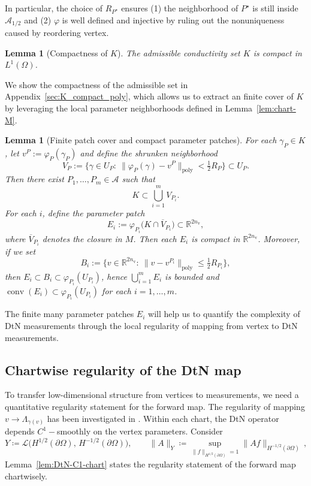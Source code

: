 \documentclass{article}
\newcommand{\R}{\mathbb{R}}
\newtheorem{lemma}[theorem]{Lemma}
\begin{document}
In particular, the choice of $R_{P^\star}$ ensures (1) the neighborhood of $P^\star$ is still inside $\mathcal{A}_{1/2}$ and (2) $\varphi$ is well defined and injective by ruling out the nonuniqueness caused by reordering vertex. 


\begin{lemma}[Compactness of $K$]\label{lem:K_compact_poly}
The admissible conductivity set $K$ is compact in $L^1(\Omega)$.
\end{lemma}
We show the compactness of the admissible set in Appendix~\ref{sec:K_compact_poly}, which allows us to extract an finite cover of $K$ by leveraging the local parameter neighborhoods defined in Lemma~\ref{lem:chart-M}.

\begin{lemma}[Finite patch cover and compact parameter patches]\label{lem:finite-atlas}
For each $\gamma_P\in K$, let $v^P:=\varphi_P(\gamma_P)$ and define the shrunken neighborhood
\[
V_{P}:=\Big\{\gamma\in U_P:\ \|\varphi_P(\gamma)-v^{P}\|_{\mathrm{poly}}<\tfrac12 R_{P}\Big\}\subset U_P .
\]
Then there exist $P_1,\dots,P_m\in\mathcal A$ such that
\[
K\subset \bigcup_{i=1}^m V_{P_i}.
\]
For each $i$, define the parameter patch
\[
E_i:=\varphi_{P_i}\bigl(K\cap \overline{V}_{P_i}\bigr)\subset \R^{2n_{\mathrm v}},
\]
where $\overline{V}_{P_i}$ denotes the closure in $M$.
Then each $E_i$ is compact in $\R^{2n_{\mathrm v}}$. Moreover, if we set
\[
B_i:=\Big\{v\in\R^{2n_{\mathrm v}}:\ \|v-v^{P_i}\|_{\mathrm{poly}}\le \tfrac12 R_{P_i}\Big\},
\]
then $E_i\subset B_i\subset \varphi_{P_i}(U_{P_i})$, hence $\bigcup_{i=1}^m E_i$ is bounded and $\operatorname{conv}(E_i)\subset \varphi_{P_i}(U_{P_i})$ for each  $i=1,\dots,m$.

\end{lemma}

The finite many parameter patches $E_i$ will help us to quantify the complexity of DtN measurements through the local regularity of mapping from vertex to DtN measurements. 


\subsection{Chartwise regularity of the DtN map}\label{sec:chartwise_DtN}
To transfer low-dimensional structure from vertices to measurements, we need a quantitative regularity statement for the forward map. The regularity of mapping $v \to \Lambda_{\gamma(v)}$ has been investigated in \citet{alberti2022inverse, beretta2017differentiability, beretta2022global}. Within each chart, the DtN operator depends $C^1-$smoothly on the vertex parameters. 
Consider
\[
Y \coloneqq  \mathcal{L}\!\big(H^{1/2}(\partial\Omega),\,H^{-1/2}(\partial\Omega)\big),
\qquad
\|A\|_Y \coloneqq  \sup_{\|f\|_{H^{1/2}(\partial\Omega)}=1}\|Af\|_{H^{-1/2}(\partial\Omega)}\,,
\]
Lemma~\ref{lem:DtN-C1-chart} states the regularity statement of the forward map chartwisely. 
\end{document}
